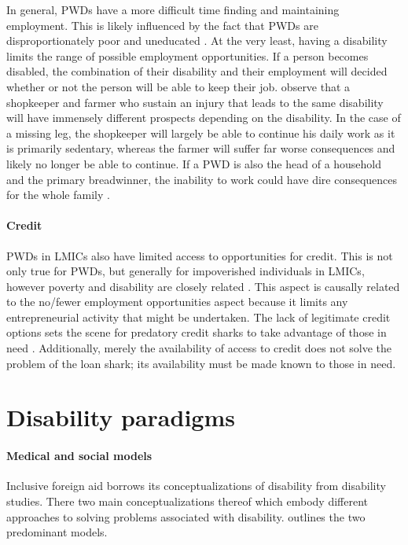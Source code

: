 \documentclass[a4paper]{article}
\begin{document}
In general, PWDs have a more difficult time finding and maintaining
employment. This is likely influenced by the fact that PWDs are
disproportionately poor and uneducated \cite{lamichhane2014nexus}. At the very
least, having a disability limits the range of possible employment
opportunities. If a person becomes disabled, the combination of their
disability and their employment will decided whether or not the person will be
able to keep their job. \cite{chowdhury2006economics} observe that a
shopkeeper and farmer who sustain an injury that leads to the same disability
will have immensely different prospects depending on the disability. In the
case of a missing leg, the shopkeeper will largely be able to continue his
daily work as it is primarily sedentary, whereas the farmer will suffer far
worse consequences and likely no longer be able to continue. If a PWD is also
the head of a household and the primary breadwinner, the inability to work
could have dire consequences for the whole family \citep{world2011world}.

\paragraph{Credit}

PWDs in LMICs also have limited access to opportunities for credit. This is
not only true for PWDs, but generally for impoverished individuals in LMICs,
however poverty and disability are closely related
\citep{palmer2011disability}. This aspect is causally related to the no/fewer
employment opportunities aspect because it limits any entrepreneurial activity
that might be undertaken. The lack of legitimate credit options sets the scene
for predatory credit sharks to take advantage of those in need
\citep{beisland2017exploring}. Additionally, merely the availability of access
to credit does not solve the problem of the loan shark; its availability must
be made known to those in need.

\newpage
\section{Disability paradigms}
\label{models}

\paragraph{Medical and social models} 

Inclusive foreign aid borrows its conceptualizations of disability from
disability studies. There two main conceptualizations thereof which embody
different approaches to solving problems associated with disability.
\cite{winter2003development} outlines the two predominant models.
\end{document}
